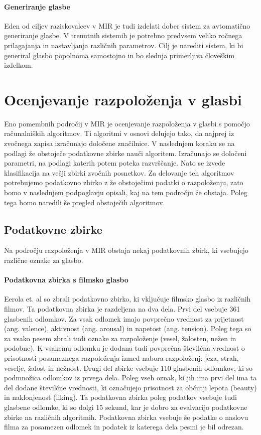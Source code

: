 \documentclass[a4paper, 12pt]{book}
\begin{document}
{\paragraph{Generiranje glasbe}

Eden od ciljev raziskovalcev v MIR je tudi izdelati dober sistem za avtomatično generiranje glasbe. V trenutnih sistemih je potrebno predvsem veliko ročnega prilagajanja in nastavljanja različnih parametrov. Cilj je narediti sistem, ki bi generiral glasbo popolnoma samostojno in bo slednja primerljiva človeškim izdelkom.



\section{Ocenjevanje razpoloženja v glasbi}

Eno pomembnih področij v MIR je ocenjevanje razpoloženja v glasbi s pomočjo računalniških algoritmov. Ti algoritmi v osnovi delujejo tako, da najprej iz zvočnega zapisa izračunajo določene značilnice. V naslednjem koraku se na podlagi že obstoječe podatkovne zbirke nauči algoritem. Izračunajo se določeni parametri, na podlagi katerih potem poteka razvrščanje. Nato se izvede klasifikacija na večji zbirki zvočnih posnetkov. Za delovanje teh algoritmov potrebujemo podatkovno zbirko z že obstoječimi podatki o razpoloženju, zato bomo v naslednjem podpoglavju opisali, kaj na tem področju že obstaja. Poleg tega bomo naredili še pregled obstoječih algoritmov.

\subsection{Podatkovne zbirke}

Na področju razpoloženja v MIR obstaja nekaj podatkovnih zbirk, ki vsebujejo različne oznake za glasbo. 

\paragraph{Podatkovna zbirka s filmsko glasbo}

Eerola et. al \cite{Eerola2010} so zbrali podatkovno zbirko, ki vključuje filmsko glasbo iz različnih filmov. Ta podatkovna zbirka je razdeljena na dva dela. Prvi del vsebuje 361 glasbenih odlomkov. Za vsak odlomek imajo povprečno vrednost za prijetnost (ang. valence), aktivnost (ang. arousal) in  napetost (ang. tension). Poleg tega so za vsako pesem zbrali tudi oznake za razpoloženje (vesel, žalosten, nežen in podobne). K vsakemu odlomku je dodana tudi povprečna številčna vrednost o prisotnosti posameznega razpoloženja izmed nabora razpoloženj: jeza, strah, veselje, žalost in nežnost. Drugi del zbirke vsebuje 110 glasbenih odlomkov, ki so podmnožica odlomkov iz prvega dela. Poleg vseh oznak, ki jih ima prvi del ima ta del dodane številčne vrednosti, ki označujejo prisotnost za občutji lepota (beauty) in naklonjenost (liking). Ta podatkovna zbirka poleg podatkov vsebuje tudi glasbene odlomke, ki so dolgi 15 sekund, kar je dobro za evalvacijo podatkovne zbirke na različnih algoritmih. Podatkovna zbirka vsebuje še podatke o naslovu filma za posamezen odlomek in podatek iz katerega dela pesmi je bil odrezan. 

}
\end{document}
